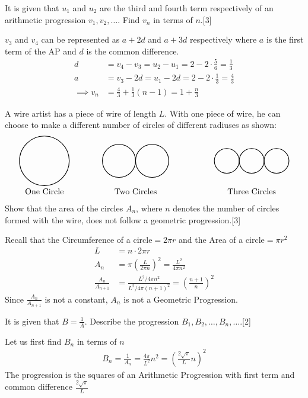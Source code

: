 \documentclass[12pt, a4 paper]{article}
\begin{document}
\begin{outline}[enumerate]
 \2 It is given that \(u_{1}\) and \(u_{2}\) are the third and fourth term respectively of an arithmetic progression \(v_{1},v_{2},\dots \). Find \(v_{n}\) in terms of \(n\).\hfill[3]
 \begin{answer}
  \(v_3\) and \(v_4\) can be represented as \(a+2d\) and \(a+3d\) respectively where \(a\) is the first term of the AP and \(d\) is the common difference.
  \begin{align*}
   d            & =v_4-v_3=u_2-u_1 = 2-2\cdot\frac{5}{6} = \frac{1}{3}     \\
   a            & = v_3 -2d = u_1 - 2d = 2-2\cdot\frac{1}{3} = \frac{4}{3} \\
   \implies v_n & = \frac{4}{3} + \frac{1}{3}(n-1) = 1+\frac{n}{3}
  \end{align*}
 \end{answer}

 \1 A wire artist has a piece of wire of length \(L\). With one piece of wire, he can choose to make a different number of circles of different radiuses as shown: %
 \[
  \begin{tikzpicture}
   \draw[thick] (0,0) circle (30pt);
   \draw (0,-30pt) node[below]{One Circle};
   \draw[thick] (90pt,0) circle (20pt);
   \draw[thick] (130pt,0) circle (20pt);
   \draw (110pt,-30pt) node[below]{Two Circles};
   \draw[thick] (220pt,0) circle (15pt);
   \draw[thick] (250pt,0) circle (15pt);
   \draw[thick] (280pt,0) circle (15pt);
   \draw (250pt,-30pt) node[below]{Three Circles};
  \end{tikzpicture}
 \]
 \2 Show that the area of the circles \(A_{n}\), where \(n\) denotes the number of circles formed with the wire, does not follow a geometric progression.\hfill[3]
 \begin{answer}
  Recall that the Circumference of a circle\(=2\pi r\) and the Area of a circle\(=\pi r^2\)
  \begin{align*}
   L                   & = n\cdot2\pi r                                                            \\
   A_n                 & = \pi {\left(\frac{L}{2\pi n}\right)}^2 = \frac{L^2}{4\pi n^2}            \\
   \frac{A_n}{A_{n+1}} & = \frac{L^2/4\pi n^2}{L^2/4 \pi {(n+1)}^2}={\left(\frac{n+1}{n}\right)}^2
  \end{align*}
  Since \(\frac{A_n}{A_{n+1}}\) is not a constant, \(A_n\) is not a Geometric Progression.
 \end{answer}

 \2 It is given that \(B=\frac{1}{A}\). Describe the progression \(B_{1},B_{2},\dots,B_{n},\dots \).\hfill[2]
 \begin{answer}
  Let us first find \(B_n\) in terms of \(n\)
  \begin{align*}
   B_n = \frac{1}{A_n} = \frac{4\pi}{L^2}n^2 = {\left(\frac{2\sqrt\pi}{L}n\right)}^2
  \end{align*}
  The progression is the squares of an Arithmetic Progression with first term and common difference \(\frac{2\sqrt\pi}{L}\)
 \end{answer}


\end{outline}
\end{document}
